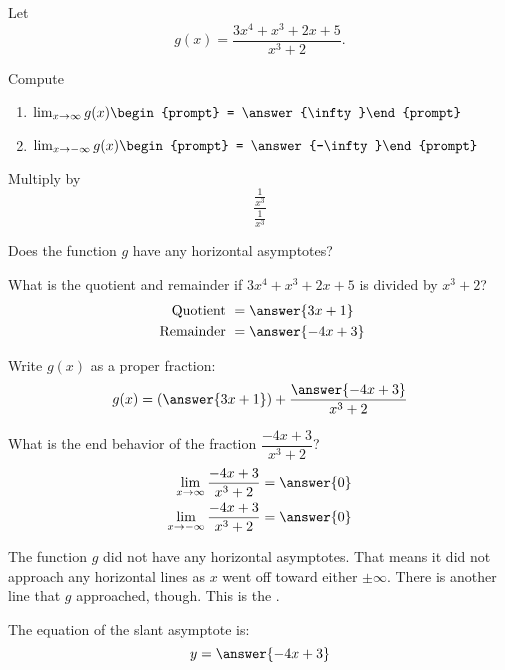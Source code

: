 \documentclass{ximera}
\author{Bobby Ramsey}
\begin{document}
\begin{exercise}
	Let \[ g(x) = \frac{3x^4+x^3+2x+5}{x^3+2}. \]
	
	Compute

	\begin{enumerate}
		\item $\lim_{x\to \infty} g(x) \begin{prompt} = \answer{\infty}\end{prompt}$
		\item $\lim_{x\to -\infty}g(x) \begin{prompt} = \answer{-\infty}\end{prompt}$
	\end{enumerate}

	\begin{hint}
		Multiply by \[\frac{\frac{1}{x^3}}{\frac{1}{x^3}}\]
	\end{hint}

	\begin{exercise}
		Does the function $g$ have any horizontal asymptotes?
		\begin{multipleChoice}
		\end{multipleChoice}
		
		\begin{exercise}
			What is the quotient and remainder if $3x^4+x^3+2x+5$ is divided by $x^3+2$?
			\begin{align*}
				\text{ Quotient } &= \answer{3x+1}\\
				\text{ Remainder } &= \answer{-4x+3}	
			\end{align*}
			\begin{exercise}
				Write $g(x)$ as a proper fraction:
				\[ g(x) = \left( \answer{3x+1} \right) + \frac{\answer{-4x+3}}{x^3+2} \]
				\begin{exercise}
					What is the end behavior of the fraction $\dfrac{-4x+3}{x^3+2}$?
					\begin{align*}
						\lim_{x\to \infty} \frac{-4x+3}{x^3+2} &= \answer{0} \\
						\lim_{x\to -\infty} \frac{-4x+3}{x^3+2} &= \answer{0} \\
					\end{align*}
					\begin{exercise}
						The function $g$ did not have any horizontal asymptotes.  That means it did not approach any horizontal lines as $x$ went off toward either $\pm \infty$.
						There is another line that $g$ approached, though.  This is the .
						\begin{exercise}	
							The equation of the slant asymptote is:
							\[ y = \answer{-4x+3} \]
						\end{exercise}
					\end{exercise}
				\end{exercise}
			\end{exercise}
		\end{exercise}
	\end{exercise}
\end{exercise}
\end{document}
